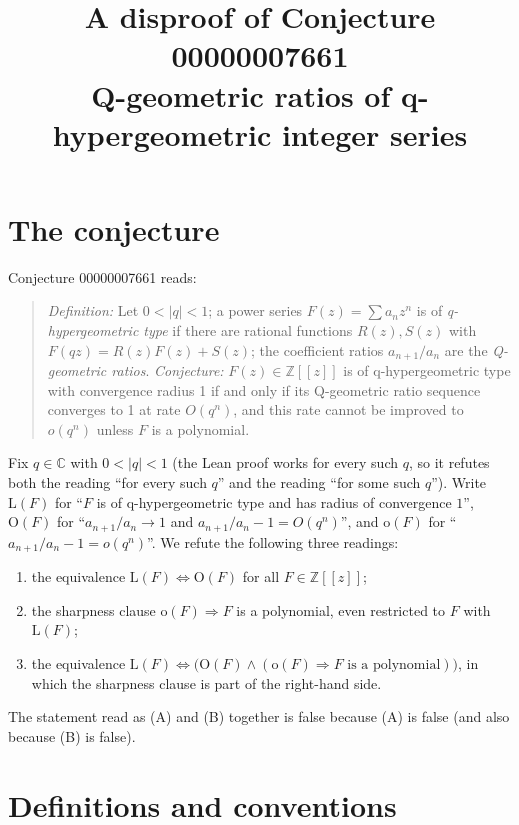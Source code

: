 \documentclass[11pt]{article}
\title{A disproof of Conjecture 00000007661\\[2pt]
\large Q-geometric ratios of q-hypergeometric integer series}
\date{}
\theoremstyle{definition}
\theoremstyle{remark}
\renewcommand{\_}{\oldus\allowbreak}
\begin{document}
\sloppy
\maketitle

\section{The conjecture}

Conjecture 00000007661 reads:

\begin{quote}
\emph{Definition:} Let $0<|q|<1$; a power series $F(z)=\sum a_n z^n$ is of \emph{q-hypergeometric type}
if there are rational functions $R(z),S(z)$ with $F(qz)=R(z)F(z)+S(z)$; the coefficient ratios
$a_{n+1}/a_n$ are the \emph{Q-geometric ratios}. \emph{Conjecture:} $F(z)\in\mathbb Z[[z]]$ is of
q-hypergeometric type with convergence radius 1 if and only if its Q-geometric ratio sequence converges to
1 at rate $O(q^n)$, and this rate cannot be improved to $o(q^n)$ unless $F$ is a polynomial.
\end{quote}

Fix $q\in\mathbb C$ with $0<|q|<1$ (the Lean proof works for every such $q$, so it refutes both the
reading ``for every such $q$'' and the reading ``for some such $q$''). Write
$\mathrm{L}(F)$ for ``$F$ is of q-hypergeometric type and has radius of convergence $1$'',
$\mathrm{O}(F)$ for ``$a_{n+1}/a_n\to1$ and $a_{n+1}/a_n-1=O(q^n)$'', and
$\mathrm{o}(F)$ for ``$a_{n+1}/a_n-1=o(q^n)$''. We refute the following three readings:
\begin{enumerate}[label=(\Alph*)]
  \item the equivalence $\mathrm{L}(F)\iff\mathrm{O}(F)$ for all $F\in\mathbb Z[[z]]$;
  \item the sharpness clause $\mathrm{o}(F)\Rightarrow F$ is a polynomial, even restricted to $F$ with
        $\mathrm{L}(F)$;
  \item the equivalence $\mathrm{L}(F)\iff\bigl(\mathrm{O}(F)\wedge(\mathrm{o}(F)\Rightarrow F\text{ is a
        polynomial})\bigr)$, in which the sharpness clause is part of the right-hand side.
\end{enumerate}
The statement read as (A) and (B) together is false because (A) is false (and also because (B) is false).

\section{Definitions and conventions}
\end{document}
